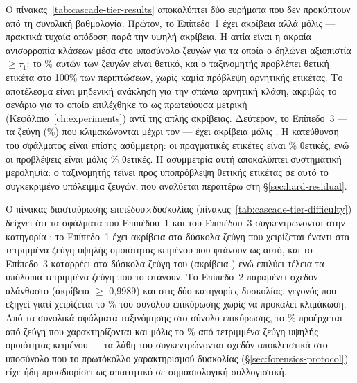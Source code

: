 Ο πίνακας~\ref{tab:cascade-tier-results} αποκαλύπτει δύο ευρήματα που δεν προκύπτουν από
τη συνολική βαθμολογία.
Πρώτον, το Επίπεδο~1 έχει ακρίβεια \TierOneAcc{} αλλά 
μόλις \TierOneFone --- πρακτικά τυχαία απόδοση παρά την υψηλή ακρίβεια.
Η αιτία είναι η
ακραία ανισορροπία κλάσεων μέσα στο υποσύνολο ζευγών για τα οποία ο
\texttt{} δηλώνει αξιοπιστία $\geq \tau_1$: το \TierOnePosPct\% αυτών
των ζευγών είναι θετικό, και ο ταξινομητής προβλέπει θετική ετικέτα στο 100\% των
περιπτώσεων, χωρίς καμία πρόβλεψη αρνητικής ετικέτας.
Το αποτέλεσμα είναι μηδενική
ανάκληση για την σπάνια αρνητική κλάση, ακριβώς το σενάριο για το οποίο επιλέχθηκε το
 ως πρωτεύουσα μετρική (Κεφάλαιο~\ref{ch:experiments}) αντί της απλής
ακρίβειας.
Δεύτερον, το Επίπεδο~3 --- τα \TierThreeCount{} ζεύγη (\TierThreePct\%) που κλιμακώνονται μέχρι τον
\texttt{} --- έχει ακρίβεια μόλις \TierThreeAcc.
Η κατεύθυνση του
σφάλματος είναι επίσης ασύμμετρη: οι πραγματικές ετικέτες είναι \TierThreeTruePosPct\% θετικές, ενώ οι
προβλέψεις είναι μόλις \TierThreePredPosPct\% θετικές.
Η ασυμμετρία αυτή αποκαλύπτει συστηματική
μεροληψία: ο ταξινομητής  τείνει προς υποπρόβλεψη θετικής ετικέτας σε αυτό
το συγκεκριμένο υπόλειμμα ζευγών, που αναλύεται περαιτέρω στη \S\ref{sec:hard-residual}.

Ο πίνακας διασταύρωσης επιπέδου$\times$δυσκολίας (πίνακας~\ref{tab:cascade-tier-difficulty})
δείχνει ότι τα σφάλματα του Επιπέδου~1 και του Επιπέδου~3 συγκεντρώνονται στην κατηγορία
: το Επίπεδο~1 έχει ακρίβεια \TierOneHardAcc{} στα \TierOneHardN{} δύσκολα ζεύγη που χειρίζεται
έναντι \TierOneHighTextsimAcc{} στα τετριμμένα ζεύγη υψηλής ομοιότητας κειμένου που φτάνουν ως αυτό, και το
Επίπεδο~3 καταρρέει στα \TierThreeHardN{} δύσκολα ζεύγη του (ακρίβεια \TierThreeHardAcc) ενώ επιλύει τέλεια τα
υπόλοιπα \TierThreeHighTextsimN{} τετριμμένα ζεύγη που το φτάνουν.
Το Επίπεδο~2 παραμένει σχεδόν αλάνθαστο
(ακρίβεια $\geq$ 0{,}9989) και στις δύο κατηγορίες δυσκολίας, γεγονός που εξηγεί γιατί
χειρίζεται το \TierTwoPct\% του συνόλου επικύρωσης χωρίς να προκαλεί κλιμάκωση.
Από τα \CascadeTotalErrors{}
συνολικά σφάλματα ταξινόμησης στο σύνολο επικύρωσης, το \CascadeErrorsHardPct\% προέρχεται από ζεύγη
που χαρακτηρίζονται  και μόλις το \CascadeErrorsTrivialPct\% από τετριμμένα ζεύγη υψηλής ομοιότητας
κειμένου --- τα λάθη του  συγκεντρώνονται σχεδόν αποκλειστικά στο υποσύνολο
που το πρωτόκολλο χαρακτηρισμού δυσκολίας (\S\ref{sec:forensics-protocol}) είχε ήδη
προσδιορίσει ως απαιτητικό σε σημασιολογική συλλογιστική.

